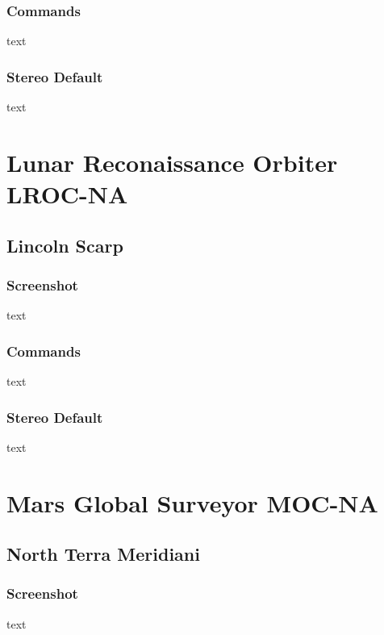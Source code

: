 \subsubsection*{Commands}

text

\subsubsection*{Stereo Default}

text

\section{Lunar Reconaissance Orbiter LROC-NA}

\subsection{Lincoln Scarp}

\subsubsection*{Screenshot}

text

\subsubsection*{Commands}

text

\subsubsection*{Stereo Default}

text

\section{Mars Global Surveyor MOC-NA}

\subsection{North Terra Meridiani}

\subsubsection*{Screenshot}

text

